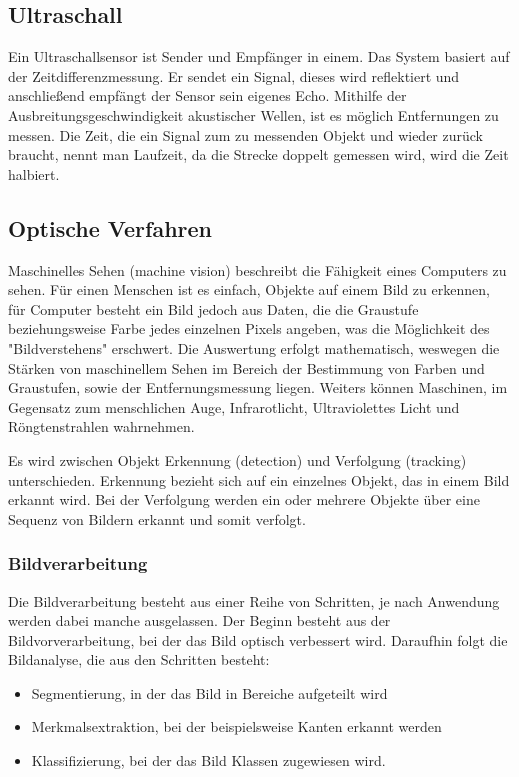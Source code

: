     \subsection*{Ultraschall}
    Ein Ultraschallsensor ist Sender und Empfänger in einem. Das System basiert auf der Zeitdifferenzmessung. Er sendet ein Signal, dieses wird reflektiert und anschließend empfängt der Sensor sein eigenes Echo. Mithilfe der Ausbreitungsgeschwindigkeit akustischer Wellen, ist es möglich Entfernungen zu messen. Die Zeit, die ein Signal zum zu messenden Objekt und wieder zurück braucht, nennt man Laufzeit, da die Strecke doppelt gemessen wird, wird die Zeit halbiert.

    \subsection{Optische Verfahren}
    Maschinelles Sehen (machine vision)\cite{machinevision} \cite{machinevision2} beschreibt die Fähigkeit eines Computers zu sehen.
    Für einen Menschen ist es einfach, Objekte auf einem Bild zu erkennen, für Computer besteht ein Bild jedoch aus Daten, die die Graustufe beziehungsweise Farbe jedes einzelnen Pixels angeben, was die Möglichkeit des "Bildverstehens" erschwert.
    Die Auswertung erfolgt mathematisch, weswegen die Stärken von maschinellem Sehen im Bereich der Bestimmung von Farben und Graustufen, sowie der Entfernungsmessung liegen. Weiters können Maschinen, im Gegensatz zum menschlichen Auge, Infrarotlicht, Ultraviolettes Licht und Röngtenstrahlen wahrnehmen.

    Es wird zwischen Objekt Erkennung (detection)\cite{obj_det_trak} und Verfolgung (tracking) unterschieden. Erkennung bezieht sich auf ein einzelnes Objekt, das in einem Bild erkannt wird. Bei der Verfolgung werden ein oder mehrere Objekte über eine Sequenz von Bildern erkannt und somit verfolgt.
    
    \subsubsection{Bildverarbeitung}
    Die Bildverarbeitung \cite{Bildverarbeitung2} besteht aus einer Reihe von Schritten, je nach Anwendung werden dabei manche ausgelassen.
    Der Beginn besteht aus der Bildvorverarbeitung, bei der das Bild optisch verbessert wird. Daraufhin folgt die Bildanalyse, die aus den Schritten besteht: 
    \begin{itemize}
    \item Segmentierung, in der das Bild in Bereiche aufgeteilt wird
    \item Merkmalsextraktion, bei der beispielsweise Kanten erkannt werden
    \item Klassifizierung, bei der das Bild Klassen zugewiesen wird.
    \end{itemize}

